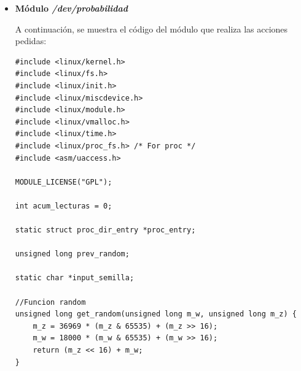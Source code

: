 \documentclass[a4paper,11pt] {article}
\begin{document}
\begin{itemize}
\begin{verbatim}
MODULE_LICENSE ("GPL");

struct page *pg;
pgprot_t prot;

void **sys_call_table = (void *)SYS_CALL_TABLE_ADDRESS;

asmlinkage int (*original_sys_call) (const char *pathname);

//Función dummy para mkdir
asmlinkage int fake_mkdir_function(const char __user *pathname) {
    printk(KERN_ALERT "No se permite la ejecucion de mkdir!\n");

    return 0;
}

static int my_init (void) {
    //Guardo la llamada original a mkdir
    original_sys_call = sys_call_table[__NR_mkdir];

    //Marco la pagina asociada con permisos r-w-x
    pg = virt_to_page( SYS_CALL_TABLE_ADDRESS );
    prot.pgprot = VM_READ | VM_WRITE | VM_EXEC;
    change_page_attr(pg, 1, prot);
    
    //Modifico la entrada para asignarle la función dummy
    sys_call_table[__NR_mkdir] = fake_mkdir_function;

    return 0;
}

static void my_exit (void) {
    //Reestablezco la llamada original de mkdir
    sys_call_table[__NR_mkdir] = original_sys_call;
}

module_init(my_init);
module_exit(my_exit);
\end{verbatim}

	\item \textbf{Módulo \textit{/dev/probabilidad}}

	A continuación, se muestra el código del módulo que realiza las acciones pedidas:

\begin{verbatim}
#include <linux/kernel.h>
#include <linux/fs.h>
#include <linux/init.h>
#include <linux/miscdevice.h>
#include <linux/module.h>
#include <linux/vmalloc.h>
#include <linux/time.h>
#include <linux/proc_fs.h> /* For proc */
#include <asm/uaccess.h>

MODULE_LICENSE("GPL");

int acum_lecturas = 0;

static struct proc_dir_entry *proc_entry;

unsigned long prev_random;

static char *input_semilla;

//Funcion random
unsigned long get_random(unsigned long m_w, unsigned long m_z) {
    m_z = 36969 * (m_z & 65535) + (m_z >> 16);
    m_w = 18000 * (m_w & 65535) + (m_w >> 16);
    return (m_z << 16) + m_w;
}


\end{verbatim}
\end{itemize}
\end{document}
